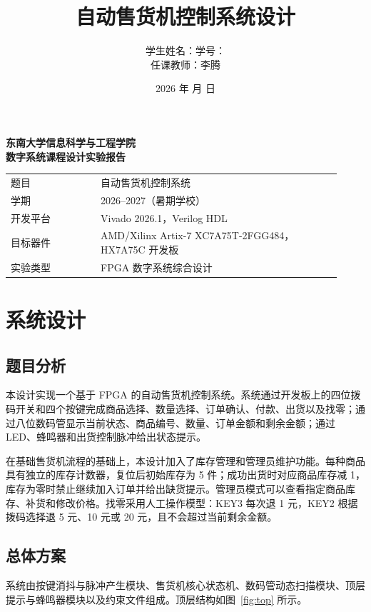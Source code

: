\documentclass[UTF8,a4paper,12pt]{ctexart}
\title{自动售货机控制系统设计}
\author{学生姓名：\underline{\hspace{4cm}}\quad 学号：\underline{\hspace{4cm}}\\[0.6em]
任课教师：李腾}
\date{2026 年 \hspace{1cm} 月 \hspace{1cm} 日}
\begin{document}
\begin{center}
  {\bfseries 东南大学信息科学与工程学院\\[0.8em]}
  {\bfseries 数字系统课程设计实验报告}
\end{center}
\vspace{1em}

\begin{center}
\begin{tabular}{>{\raggedright\arraybackslash}p{0.25\linewidth}p{0.67\linewidth}}
题目 & 自动售货机控制系统 \\
学期 & 2026--2027（暑期学校） \\
开发平台 & Vivado 2026.1，Verilog HDL \\
目标器件 & AMD/Xilinx Artix-7 XC7A75T-2FGG484，HX7A75C 开发板 \\
实验类型 & FPGA 数字系统综合设计
\end{tabular}
\end{center}

\tableofcontents
\newpage

\section{系统设计}

\subsection{题目分析}

本设计实现一个基于 FPGA 的自动售货机控制系统。系统通过开发板上的四位拨码开关和四个按键完成商品选择、数量选择、订单确认、付款、出货以及找零；通过八位数码管显示当前状态、商品编号、数量、订单金额和剩余金额；通过 LED、蜂鸣器和出货控制脉冲给出状态提示。

在基础售货机流程的基础上，本设计加入了库存管理和管理员维护功能。每种商品具有独立的库存计数器，复位后初始库存为 5 件；成功出货时对应商品库存减 1，库存为零时禁止继续加入订单并给出缺货提示。管理员模式可以查看指定商品库存、补货和修改价格。找零采用人工操作模型：KEY3 每次退 1 元，KEY2 根据拨码选择退 5 元、10 元或 20 元，且不会超过当前剩余金额。

\subsection{总体方案}

系统由按键消抖与脉冲产生模块、售货机核心状态机、数码管动态扫描模块、顶层提示与蜂鸣器模块以及约束文件组成。顶层结构如图~\ref{fig:top} 所示。
\end{document}
